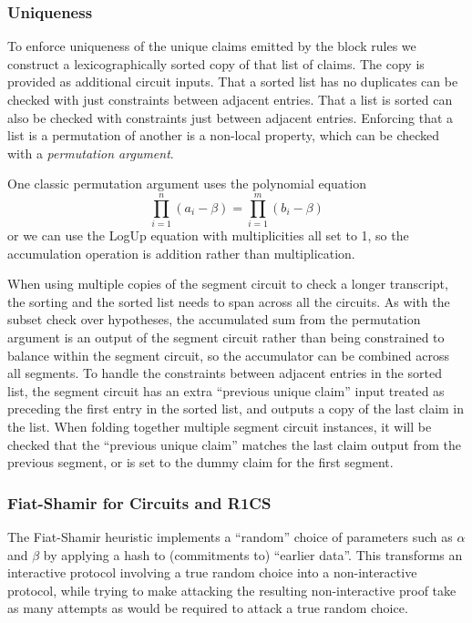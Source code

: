 \documentclass{article}
\theoremstyle{plain}
\theoremstyle{definition}
\begin{document}
\subsubsection{Uniqueness}

To enforce uniqueness of the unique claims emitted by the block rules
we construct a lexicographically sorted copy of that list of claims.
The copy is provided as additional circuit inputs.
That a sorted list has no duplicates can be checked with just
constraints between adjacent entries.
That a list is sorted can also be checked with constraints just
between adjacent entries.
Enforcing that a list is a permutation of another is a non-local
property, which can be checked with a \emph{permutation argument}.

One classic permutation argument uses the polynomial equation
\[\prod_{i=1}^n (a_i-\beta) = \prod_{i=1}^m (b_i-\beta)\]
or we can use the LogUp equation with multiplicities all set to 1,
so the accumulation operation is addition rather than multiplication.

When using multiple copies of the segment circuit to check a longer
transcript, the sorting and the sorted list needs to span across all
the circuits.
As with the subset check over hypotheses, the accumulated sum from
the permutation argument is an output of the segment circuit rather than
being constrained to balance within the segment circuit, so the
accumulator can be combined across all segments.
To handle the constraints between adjacent entries in the sorted list,
the segment circuit has an extra ``previous unique claim'' input treated
as preceding the first entry in the sorted list, and outputs a copy of
the last claim in the list.
When folding together multiple segment circuit instances, it will be checked
that the ``previous unique claim'' matches the last claim output from the
previous segment, or is set to the dummy claim for the first segment.

\subsubsection{Fiat-Shamir for Circuits and R1CS}

The Fiat-Shamir heuristic implements a ``random'' choice of parameters
such as $\alpha$ and $\beta$ by applying a hash to (commitments to)
``earlier data''.
This transforms an interactive protocol involving a true random choice
into a non-interactive protocol, while trying to make attacking the
resulting non-interactive proof take as many attempts as would be
required to attack a true random choice.
\end{document}
